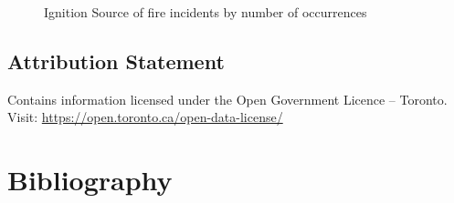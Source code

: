\documentclass[
  letterpaper,
  DIV=11,
  numbers=noendperiod]{scrartcl}
\begin{document}
\begin{figure}


\caption{\label{fig-source}Ignition Source of fire incidents by number
of occurrences}

\end{figure}%

\subsection{Attribution Statement}\label{attribution-statement}

Contains information licensed under the Open Government Licence --
Toronto. Visit: \url{https://open.toronto.ca/open-data-license/}

\newpage

\section*{Bibliography}\label{bibliography}
\end{document}
